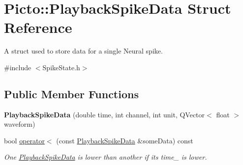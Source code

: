 \hypertarget{struct_picto_1_1_playback_spike_data}{\section{Picto\-:\-:Playback\-Spike\-Data Struct Reference}
\label{struct_picto_1_1_playback_spike_data}
}


A struct used to store data for a single Neural spike.  




{\ttfamily \#include $<$Spike\-State.\-h$>$}

\subsection*{Public Member Functions}
\begin{DoxyCompactItemize}
\item 
\hypertarget{struct_picto_1_1_playback_spike_data_a67cee75387b77a7580fa07f4d2c4c8a4}{{\bfseries Playback\-Spike\-Data} (double time, int channel, int unit, Q\-Vector$<$ float $>$ waveform)}\label{struct_picto_1_1_playback_spike_data_a67cee75387b77a7580fa07f4d2c4c8a4}

\item 
\hypertarget{struct_picto_1_1_playback_spike_data_a8a16705f9ecffe4014256839bb34ccda}{bool \hyperlink{struct_picto_1_1_playback_spike_data_a8a16705f9ecffe4014256839bb34ccda}{operator$<$} (const \hyperlink{struct_picto_1_1_playback_spike_data}{Playback\-Spike\-Data} \&some\-Data) const }\label{struct_picto_1_1_playback_spike_data_a8a16705f9ecffe4014256839bb34ccda}

\begin{DoxyCompactList}\small\item\em One \hyperlink{struct_picto_1_1_playback_spike_data}{Playback\-Spike\-Data} is lower than another if its time\-\_\- is lower. \end{DoxyCompactList}\end{DoxyCompactItemize}
